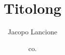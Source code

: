 \documentclass[a4paper,num-refs,strutturaTemplate]{style}
\title{Titolong}
\author[1]{Jacopo Lancione}
\author[1]{co.}
\affil[1]{affiliazione}
\begin{document}
\begin{frontmatter}
\maketitle
\thispagestyle{empty}
\tableofcontents
\end{frontmatter}


\begin{comment}
- um
- cifre significative
- c'è tutto di tutti i FIT? etichette degli assi, caption, pvalue, parametri (quelli non citati/inutili solo nel riquadrino nell'immagine del fit o in tabella in appendice)
- tutte le REF portano nel posto giusto?
- TABELLE. Ci va bene come e dove sono messe? Vogliamo uniformare tra fwhm e sigma? sigma
- inserire riferimenti al NIST e per Crystalball (secondo me basta una footnote) sì mettile
- sono chiare le procedure di misura?
- rileggere la scheda di laboratorio per essere sicuri di non aver perso per strada nulla
- ci piacciono le osservazioni che abbiamo fatto (ale ha fatto dei commenti sugli errori e su come migliorare la misura, vogliamo mettere cose simili anche nelle altre sezioni?)
- sbarazzarsi delle parti ripetute


\end{comment}



\begin{comment}
 \newpage
{
\appendix
{appendice}
} 
\end{comment}
\end{document}

